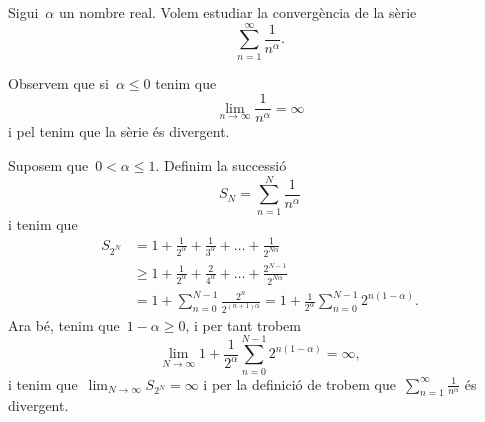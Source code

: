 \documentclass[../../main.tex]{subfiles}
\begin{document}
    \begin{example}
        \label{ex:sèrie harmònica}
        Sigui~\(\alpha\) un nombre real.
        Volem estudiar la convergència de la sèrie
        \begin{equation}
            \label{ex:sèrie harmònica:eq1}
            \sum_{n=1}^{\infty}\frac{1}{n^{\alpha}}.
        \end{equation}
        \begin{solution}
            Observem que si~\(\alpha\leq0\) tenim que
            \[
                \lim_{n\to\infty}\frac{1}{n^{\alpha}}=\infty
            \]
            i pel \corollari{}  tenim que la sèrie és divergent.

            Suposem que~\(0<\alpha\leq1\).
            Definim la successió
            \[
                S_{N}=\sum_{n=1}^{N}\frac{1}{n^{\alpha}}
            \]
            i tenim que
            \begin{align*}
                S_{2^{N}}&=1+\frac{1}{2^{\alpha}}+\frac{1}{3^{\alpha}}+\dots+\frac{1}{2^{N\alpha}}\\
                &\geq1+\frac{1}{2^{\alpha}}+\frac{2}{4^{\alpha}}+\dots+\frac{2^{N-1}}{2^{N\alpha}}\\
                &=1+\sum_{n=0}^{N-1}\frac{2^{n}}{2^{(n+1)\alpha}}=1+\frac{1}{2^{\alpha}}\sum_{n=0}^{N-1}2^{n(1-\alpha)}.
            \end{align*}
            Ara bé, tenim que~\(1-\alpha\geq0\), i per tant trobem
            \[
                \lim_{N\to\infty}1+\frac{1}{2^{\alpha}}\sum_{n=0}^{N-1}2^{n(1-\alpha)}=\infty,
            \]
            i tenim que~\(\lim_{N\to\infty}S_{2^{N}}=\infty\) i per la definició de  trobem que~\(\sum_{n=1}^{\infty}\frac{1}{n^{\alpha}}\) és divergent.


\end{solution}
\end{example}
\end{document}
